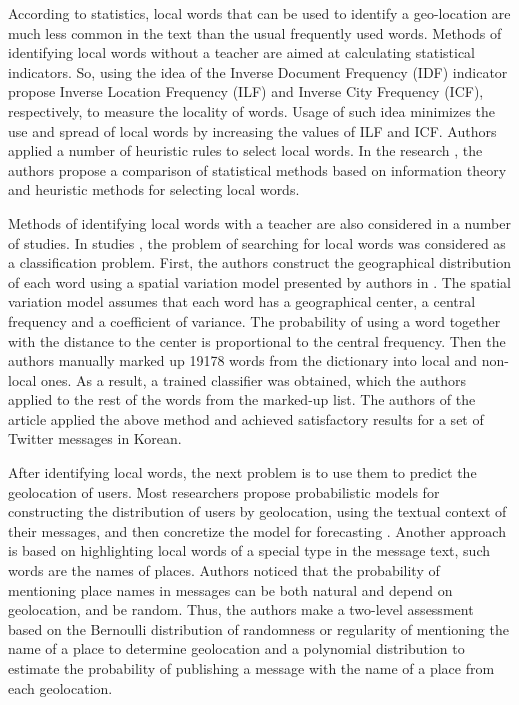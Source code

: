 According to statistics, local words that can be used to identify a geo-location are much less common in the text than the usual frequently used words. Methods of identifying local words without a teacher are aimed at calculating statistical indicators. So, using the idea of the Inverse Document Frequency (IDF) indicator \cite{RenZhangLin,HanCookBaldwin,MahmudNicholsDrews2014} propose Inverse Location Frequency (ILF) and Inverse City Frequency (ICF), respectively, to measure the locality of words. Usage of such idea minimizes the use and spread of local words by increasing the values of ILF and ICF. Authors \cite{MahmudNicholsDrews} applied a number of heuristic rules to select local words. In the research \cite{HanCookBaldwin2014}, the authors propose a comparison of statistical methods based on information theory and heuristic methods for selecting local words.

Methods of identifying local words with a teacher are also considered in a number of studies. In studies \cite{ChengCaverleeLee}, the problem of searching for local words was considered as a classification problem. First, the authors construct the geographical distribution of each word using a spatial variation model presented by authors in \cite{BackstromKleinbergKumar}. The spatial variation model assumes that each word has a geographical center, a central frequency and a coefficient of variance. The probability of using a word together with the distance to the center is proportional to the central frequency. Then the authors manually marked up 19178 words from the dictionary into local and non-local ones. As a result, a trained classifier was obtained, which the authors applied to the rest of the words from the marked-up list. The authors of the article \cite{RyooMoon} applied the above method and achieved satisfactory results for a set of Twitter messages in Korean.

After identifying local words, the next problem is to use them to predict the geolocation of users. Most researchers propose probabilistic models for constructing the distribution of users by geolocation, using the textual context of their messages, and then concretize the model for forecasting \cite{ChengCaverleeLee}. Another approach is based on highlighting local words of a special type in the message text, such words are the names of places. Authors \cite{LiWangChang} noticed that the probability of mentioning place names in messages can be both natural and depend on geolocation, and be random. Thus, the authors make a two-level assessment based on the Bernoulli distribution of randomness or regularity of mentioning the name of a place to determine geolocation and a polynomial distribution to estimate the probability of publishing a message with the name of a place from each geolocation.

